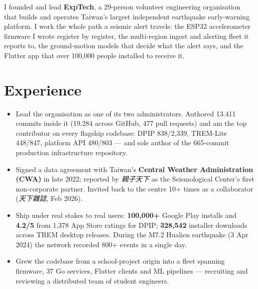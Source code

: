 \documentclass[10pt,a4paper]{article}
\begin{document}

\vspace{7pt}
{\fontsize{9.4}{12.4}\selectfont
I founded and lead \textbf{ExpTech}, a 29-person volunteer engineering organisation that builds and operates Taiwan's
largest independent earthquake early-warning platform. I work the whole path a seismic alert travels: the ESP32
accelerometer firmware I wrote register by register, the multi-region ingest and alerting fleet it reports to, the
ground-motion models that decide what the alert says, and the Flutter app that over 100,000 people installed to receive it.
\par}

\section{Experience}

\begin{itemize}
  \item Lead the organisation as one of its two administrators. Authored \num{13,411} commits inside it
        (\num{19,284} across GitHub, \num{477} pull requests) and am the top contributor on every flagship codebase:
        DPIP \num{838}/2,339, TREM-Lite \num{448}/847, platform API \num{480}/803 — and sole author of the
        665-commit production infrastructure repository.
  \item Signed a data agreement with Taiwan's \textbf{Central Weather Administration (CWA)} in late 2022; reported by
        \textit{親子天下} as the Seismological Center's first non-corporate partner. Invited back to the centre
        10+ times as a collaborator (\textit{天下雜誌}, Feb 2026).
  \item Ship under real stakes to real users: \textbf{100,000+} Google Play installs and \textbf{4.2/5} from 1,378 App Store ratings for DPIP; \textbf{328,542} installer downloads across TREM desktop releases.
        During the M7.2 Hualien earthquake (3 Apr 2024) the network recorded 800+ events in a single day.
  \item Grew the codebase from a school-project origin into a fleet spanning firmware, 37 Go services, Flutter
        clients and ML pipelines — recruiting and reviewing a distributed team of student engineers.
\end{itemize}
\end{document}
